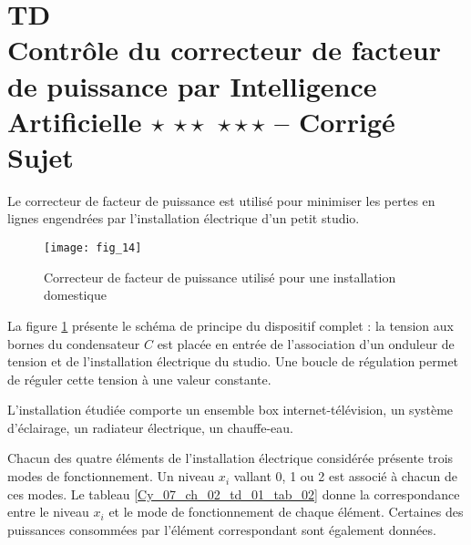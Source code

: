 \chapter*{TD  \\ 
Contrôle du correcteur de facteur de puissance par Intelligence Artificielle \ifnormal $\star$ \else \fi \ifdifficile $\star\star$ \else \fi \iftdifficile $\star\star\star$ \else \fi -- \ifprof Corrigé \else Sujet \fi}

\iflivret {} \else
\ifprof  {} \else \fi
\fi

\setcounter{question}{0}


Le correcteur de facteur de puissance est utilisé pour minimiser les pertes en lignes engendrées par l'installation électrique d'un petit studio. 

\begin{figure}[!h]
\centering
\texttt{[image: fig\_14]}
\caption{ Correcteur de facteur de puissance utilisé pour une installation domestique\label{Cy_07_ch_02_td_01_fig_14}}
\end{figure}
La figure \ref{Cy_07_ch_02_td_01_fig_14} présente le schéma de principe du dispositif complet : la tension aux bornes du condensateur $C$ est placée en entrée de l'association d'un onduleur de tension et de l'installation électrique du studio. Une boucle de régulation permet de réguler cette tension à une valeur constante. 

L'installation étudiée comporte un ensemble box internet-télévision, un système d'éclairage, un radiateur électrique, un chauffe-eau.

Chacun des quatre éléments de l'installation électrique considérée présente trois modes de fonctionnement. Un niveau $x_i$ vallant 0, 1 ou 2 est associé à chacun de ces modes. Le tableau \ref{Cy_07_ch_02_td_01_tab_02} donne la correspondance entre le niveau $x_i$ et le mode de fonctionnement de chaque élément. Certaines des puissances consommées par l'élément correspondant sont également données.


